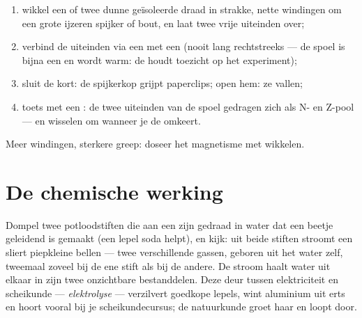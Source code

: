 \begin{method}\label{met:g8:electric-current-effects:wind}
\begin{enumerate}
  \item wikkel een  of twee dunne geïsoleerde draad in strakke,
        nette windingen om een grote ijzeren spijker of bout, en laat
        twee vrije uiteinden over;
  \item verbind de uiteinden via een  met een
         (nooit lang rechtstreeks --- de spoel is bijna
        een  en wordt warm: de
         houdt toezicht op het experiment);
  \item sluit de  kort: de spijkerkop grijpt
        paperclips; open hem: ze vallen;
  \item toets met een : de twee uiteinden van de spoel
        gedragen zich als N- en Z-pool --- en wisselen om wanneer je de
         omkeert.
\end{enumerate}
Meer windingen, sterkere greep: doseer het magnetisme met wikkelen.
\end{method}

\section{De chemische werking}

\begin{example}\label{ex:g8:electric-current-effects:electrolysis}
Dompel twee potloodstiften die aan een  zijn gedraad in
water dat een beetje geleidend is gemaakt (een lepel soda helpt), en
kijk: uit beide stiften stroomt een sliert piepkleine bellen --- twee
verschillende gassen, geboren uit het water zelf, tweemaal zoveel
 bij de ene stift als bij de andere. De stroom haalt water
uit elkaar in zijn twee onzichtbare bestanddelen. Deze deur tussen
elektriciteit en scheikunde --- \emph{elektrolyse} --- verzilvert
goedkope lepels, wint aluminium uit erts en hoort vooral bij je
scheikundecursus; de natuurkunde groet haar en loopt door.
\end{example}

